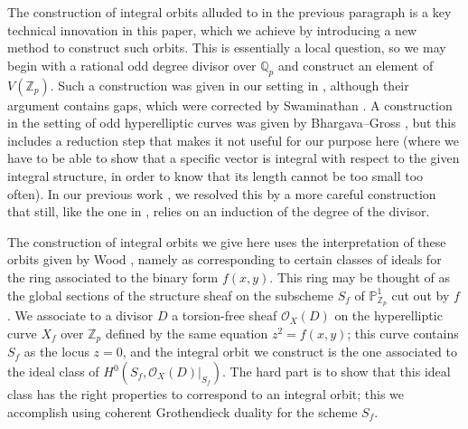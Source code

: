 \documentclass{article} %
\numberwithin{equation}{section}
\renewcommand{\P}{\mathbb{P}}
\newcommand{\cO}{\mathcal{O}}
\newcommand{\Q}{\mathbb{Q}}
\newcommand{\Z}{\mathbb{Z}}
\begin{document}
The construction of integral orbits alluded to in the previous paragraph is a key technical innovation in this paper, which we achieve by introducing a new method to construct such orbits.
This is essentially a local question, so we may begin with a rational odd degree divisor over $\Q_p$ and construct an element of $V(\Z_p)$. 
Such a construction was given in our setting in \cite[Theorem 15]{BGW17}, although their argument contains gaps, which were corrected by Swaminathan \cite[Appendix 4A]{Swaminathan-thesis}.
A construction in the setting of odd hyperelliptic curves was given by Bhargava--Gross \cite[Propostion 19]{BhargavaGross}, but this includes a reduction step that makes it not useful for our purpose here (where we have to be able to show that a specific vector is integral with respect to the given integral structure, in order to know that its length cannot be too small too often). In our previous work \cite{lagathorne2024smallheightoddhyperelliptic}, we resolved this by a more careful construction that still, like the one in \cite{BhargavaGross}, relies on an induction of the degree of the divisor. 

The construction of integral orbits we give here uses the interpretation of these orbits given by Wood \cite{Woo14}, namely as corresponding to certain classes of ideals for the ring associated to the binary form $f(x, y)$. This ring may be thought of as the global sections of the structure sheaf on the subscheme $S_f$ of $\P^1_{\Z_p}$ cut out by $f$. We associate to a divisor $D$ a torsion-free sheaf $\cO_X(D)$ on the hyperelliptic curve $X_f$ over $\Z_p$ defined by the same equation $z^2 = f(x, y)$; this curve contains $S_f$ as the locus $z = 0$, and the integral orbit we construct is the one associated to the ideal class of $H^0(S_f, \cO_X(D)|_{S_f})$. The hard part is to show that this ideal class has the right properties to correspond to an integral orbit; this we accomplish using coherent Grothendieck duality for the scheme $S_f$. 
\end{document}
